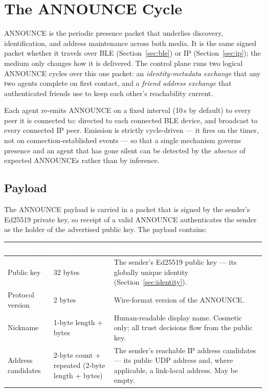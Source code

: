 \section{The ANNOUNCE Cycle}
\label{sec:announce}
ANNOUNCE is the periodic presence packet that underlies discovery, identification, and address maintenance across both media. It is the same signed packet whether it travels over BLE (Section~\ref{sec:ble}) or IP (Section~\ref{sec:ip}); the medium only changes how it is delivered. The control plane runs two logical ANNOUNCE cycles over this one packet: an \emph{identity-metadata exchange} that any two agents complete on first contact, and a \emph{friend address exchange} that authenticated friends use to keep each other's reachability current.

Each agent re-emits ANNOUNCE on a fixed interval (10\,s by default) to every peer it is connected to: directed to each connected BLE device, and broadcast to every connected IP peer. Emission is strictly cycle-driven --- it fires on the timer, not on connection-established events --- so that a single mechanism governs presence and an agent that has gone silent can be detected by the \emph{absence} of expected ANNOUNCEs rather than by inference.

\subsection{Payload}
\label{sec:announce-payload}
The ANNOUNCE payload is carried in a packet that is signed by the sender's Ed25519 private key, so receipt of a valid ANNOUNCE authenticates the sender as the holder of the advertised public key. The payload contains:
\begin{longtable}{L{3.5cm} L{3cm} L{6.5cm}}
\toprule
{}
\textcolor{white}{\textbf{Field}} &
\textcolor{white}{\textbf{Size}} &
\textcolor{white}{\textbf{Meaning}} \\
\midrule
\endhead
Public key & 32 bytes & The sender's Ed25519 public key --- its globally unique identity (Section~\ref{sec:identity}). \\
Protocol version & 2 bytes & Wire-format version of the ANNOUNCE. \\
Nickname & 1-byte length + bytes & Human-readable display name. Cosmetic only; all trust decisions flow from the public key. \\
Address candidates & 2-byte count + repeated (2-byte length + bytes) & The sender's reachable IP address candidates --- its public UDP address and, where applicable, a link-local address. May be empty. \\
\bottomrule
\end{longtable}

